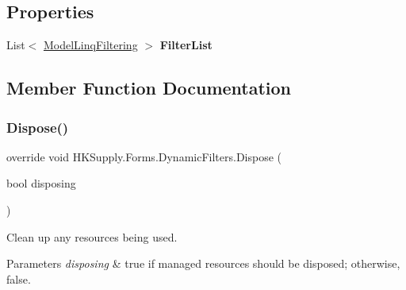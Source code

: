 \subsection*{Properties}
\begin{DoxyCompactItemize}
\item 
\mbox{\label{class_h_k_supply_1_1_forms_1_1_dynamic_filters_a7b0d4402fc028c3401ab569dc0ce150e}} 
List$<$ \hyperlink{class_h_k_supply_1_1_forms_1_1_model_linq_filtering}{Model\+Linq\+Filtering} $>$ {\bfseries Filter\+List}
\end{DoxyCompactItemize}


\subsection{Member Function Documentation}
\mbox{\label{class_h_k_supply_1_1_forms_1_1_dynamic_filters_a02f9f684c77b0ed2ba2aca58c0b87ec3}} 
\subsubsection{\texorpdfstring{Dispose()}{Dispose()}}
{\footnotesize\ttfamily override void H\+K\+Supply.\+Forms.\+Dynamic\+Filters.\+Dispose (\begin{DoxyParamCaption}\item[{bool}]{disposing }\end{DoxyParamCaption})\hspace{0.3cm}{\ttfamily [protected]}}



Clean up any resources being used. 


\begin{DoxyParams}{Parameters}
{\em disposing} & true if managed resources should be disposed; otherwise, false.\\
\hline
\end{DoxyParams}
\mbox{\label{class_h_k_supply_1_1_forms_1_1_dynamic_filters_a3fb309c2a83dbe6c5826c25007c5336f}} 
